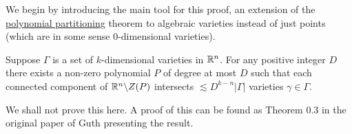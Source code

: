 We begin by introducing the main tool for this proof, 
an extension of the \hyperref[thm:PolyPartioning]{polynomial partitioning} theorem to algebraic varieties instead of just points (which are in some sense 0-dimensional varieties). 

\begin{lemma}
    Suppose $\Gamma$ is a set of $k$-dimensional varieties in $\mathbb R^n$. For any positive integer $D$ there exists a non-zero polynomial $P$ of degree at
    most $D$ such that each connected component of $\mathbb R^n \backslash Z(P)$ intersects $\lesssim D^{k-n} |\Gamma|$ varieties $\gamma \in \Gamma$.
    \label{lem:poly-part-var}
\end{lemma}
We shall not prove this here. A proof of this can be found as Theorem 0.3 in the original paper of Guth presenting the result.\cite{guth2015polypartvar}

